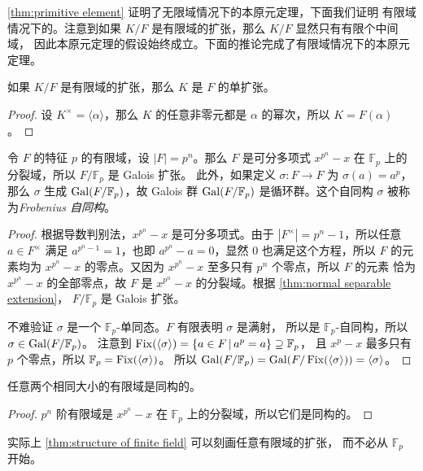 \autoref{thm:primitive element} 证明了无限域情况下的本原元定理，下面我们证明
有限域情况下的。注意到如果 $K/F$ 是有限域的扩张，那么 $K/F$ 显然只有有限个中间域，
因此本原元定理的假设始终成立。下面的推论完成了有限域情况下的本原元定理。

\begin{corollary}
  如果 $K/F$ 是有限域的扩张，那么 $K$ 是 $F$ 的单扩张。
\end{corollary}
\begin{proof}
  设 $K^\times=\langle\alpha\rangle$，那么 $K$ 的任意非零元都是 $\alpha$
  的幂次，所以 $K=F(\alpha)$。
\end{proof}

\begin{theorem}[有限域的结构定理]\label{thm:structure of finite field}
  令 $F$ 的特征 $p$ 的有限域，设 $|F|=p^n$。那么 $F$ 是可分多项式 $x^{p^n}-x$
  在 $\mathbb{F}_p$ 上的分裂域，所以 $F/\mathbb{F}_p$ 是 Galois 扩张。
  此外，如果定义 $\sigma:F\to F$ 为 $\sigma(a)=a^p$，
  那么 $\sigma$ 生成 $\operatorname{Gal}(F/\mathbb{F}_p)$，故 Galois 群 $\operatorname{Gal}(F/\mathbb{F}_p)$
  是循环群。这个自同构 $\sigma$ 被称为\emph{Frobenius 自同构}。
\end{theorem}
\begin{proof}
  根据导数判别法，$x^{p^n}-x$ 是可分多项式。由于 $|F^\times|=p^n-1$，所以任意 $a\in F^\times$ 满足
  $a^{p^n-1}=1$，也即 $a^{p^n}-a=0$，显然 $0$ 也满足这个方程，所以 $F$ 的元素均为
  $x^{p^n}-x$ 的零点。又因为 $x^{p^n}-x$ 至多只有 $p^n$ 个零点，所以 $F$ 的元素
  恰为 $x^{p^n}-x$ 的全部零点，故 $F$ 是 $x^{p^n}-x$ 的分裂域。根据 \autoref{thm:normal separable extension}，
  $F/\mathbb{F}_p$ 是 Galois 扩张。 

  不难验证 $\sigma$ 是一个 $\mathbb{F}_p$-单同态。$F$ 有限表明 $\sigma$ 是满射，
  所以是 $\mathbb{F}_p$-自同构，所以 $\sigma\in \operatorname{Gal}(F/\mathbb{F}_p)$。
  注意到 $\operatorname{Fix}(\langle\sigma\rangle)=\{a\in F\,|\, a^p=a\}\supseteq \mathbb{F}_p$，
  且 $x^p-x$ 最多只有 $p$ 个零点，所以 $\mathbb{F}_p=\operatorname{Fix}(\langle\sigma\rangle)$。
  所以 $\operatorname{Gal}(F/\mathbb{F}_p)=\operatorname{Gal}(F/\operatorname{Fix}(\langle \sigma\rangle))=\langle\sigma\rangle$。 
\end{proof} 

\begin{corollary}
  任意两个相同大小的有限域是同构的。
\end{corollary}
\begin{proof}
  $p^n$ 阶有限域是 $x^{p^n}-x$ 在 $\mathbb{F}_p$ 上的分裂域，所以它们是同构的。
\end{proof}

实际上 \autoref{thm:structure of finite field} 可以刻画任意有限域的扩张，
而不必从 $\mathbb{F}_p$ 开始。

